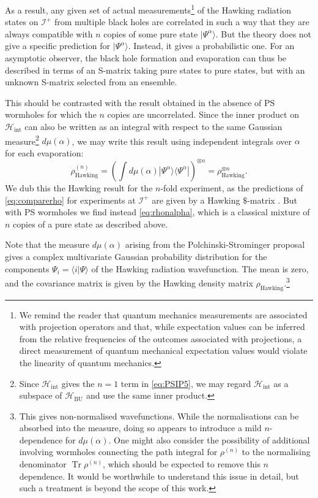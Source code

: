 \documentclass[letterpaper,12pt]{article}
\newcommand*{\hilb}{\mathcal{H}}	%
\newcommand*{\hbu}{\mathcal{H}_\text{BU}} %
\DeclareMathOperator{\Tr}{Tr}
\newcommand*{\scri}{\mathscr{I}} %
\begin{document}
As a result, any given set of actual measurements\footnote{We remind the reader that quantum mechanics measurements are associated with projection operators and that, while expectation values can be inferred from the relative frequencies of the outcomes associated with projections, a direct measurement of quantum mechanical expectation values would violate the linearity of quantum mechanics.} of the Hawking radiation states on $\scri^+$ from multiple black holes are correlated in such a way that they are always compatible with $n$ copies of some pure state $|\Psi^\alpha\rangle$.  But the theory does not give a specific prediction for $|\Psi^\alpha\rangle$.  Instead, it gives a probabilistic one. For an asymptotic observer, the black hole formation and evaporation can thus be described in terms of an S-matrix taking pure states to pure states, but with an unknown S-matrix selected from an ensemble.




This should be contrasted with the result obtained in the absence of PS wormholes for which the $n$ copies are uncorrelated.
Since the inner product on $\hilb_{\mathrm{int}}$ can also be written as an integral with respect to the same Gaussian measure\footnote{Since $\hilb_{\mathrm{int}}$ gives the $n=1$ term in \eqref{eq:PSIP5}, we may regard
$\hilb_{\mathrm{int}}$  as a subspace of $\hbu$ and use the same inner product.} $d\mu(\alpha)$, we may write this result using  independent integrals over $\alpha$ for each evaporation:
\begin{equation}
\label{eq:comparerho}
	\rho^{(n)}_{\mathrm{Hawking}} = \left(\int d\mu(\alpha) |\Psi^\alpha\rangle \langle \Psi^\alpha|\right)^{\otimes n} = \rho_\mathrm{Hawking}^{\otimes n}.
\end{equation}
We dub this the Hawking result for the $n$-fold experiment, as the predictions of \eqref{eq:comparerho} for experiments at $\scri^+$ are given by a Hawking $\$$-matrix \cite{Hawking:1976ra}.
But with PS wormholes we find instead \eqref{eq:rhonalpha}, which is a classical mixture of $n$ copies of a pure state as described above.

Note that the measure $d\mu(\alpha)$ arising from the Polchinski-Strominger proposal gives a complex multivariate Gaussian probability distribution for the components $ \Psi_i = \langle i|\Psi\rangle$ of the Hawking radiation wavefunction. The mean is zero, and the covariance matrix is given by the Hawking density matrix $\rho_\mathrm{Hawking}$.\footnote{This gives non-normalised wavefunctions. While the normalisations can be absorbed into the measure, doing so appears to introduce a mild $n$-dependence for $d\mu(\alpha)$. One might also consider the possibility of additional involving wormholes connecting the path integral for $\rho^{(n)}$ to the normalising denominator $\Tr\rho^{(n)}$, which should be expected to remove this $n$ dependence. It would be worthwhile to understand this issue in detail, but such a treatment is beyond the scope of this work.}
\end{document}
